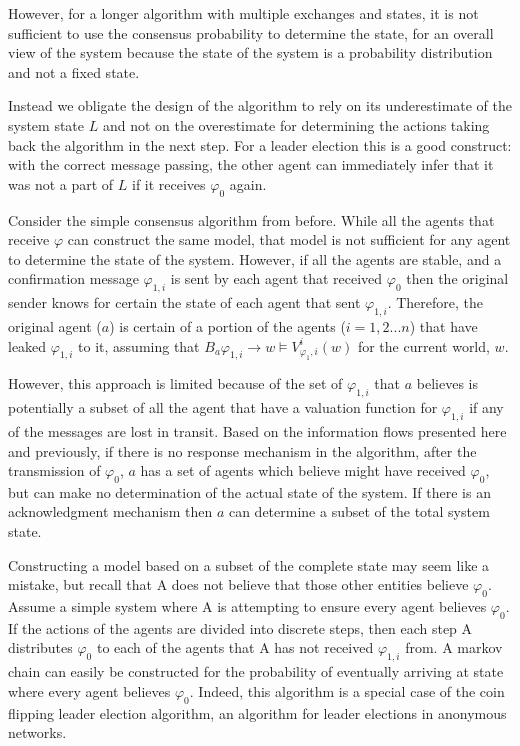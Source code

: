 However, for a longer algorithm with multiple exchanges and states, it is not sufficient to use the consensus probability to determine the state, for an overall view of the system because the state of the system is a probability distribution and not a fixed state.

Instead we obligate the design of the algorithm to rely on its underestimate of the system state $L$ and not on the overestimate for determining the actions taking back the algorithm in the next step. For a leader election this is a good construct: with the correct message passing, the other agent can immediately infer that it was not a part of $L$ if it receives $\varphi_0$ again. 

Consider the simple consensus algorithm from before. While all the agents that receive $\varphi$ can construct the same model, that model is not sufficient for any agent to determine the state of the system. However, if all the agents are stable, and a confirmation message $\varphi_{1,i}$ is sent by each agent that received $\varphi_0$ then the original sender knows for certain the state of each agent that sent $\varphi_{1,i}$. Therefore, the original agent ($a$) is certain of a portion of the agents ($i=1,2...n$) that have leaked $\varphi_{1,i}$ to it, assuming that $B_a \varphi_{1,i} \rightarrow w \vDash V_{\varphi_1,i}^i(w)$ for the current world, $w$.

However, this approach is limited because of the set of $\varphi_{1,i}$ that $a$ believes is potentially a subset of all the agent that have a valuation function for $\varphi_{1,i}$ if any of the messages are lost in transit. Based on the information flows presented here and previously, if there is no response mechanism in the algorithm, after the transmission of $\varphi_0$, $a$ has a set of agents which believe might have received $\varphi_0$, but can make no determination of the actual state of the system. If there is an acknowledgment mechanism then $a$ can determine a subset of the total system state. 

Constructing a model based on a subset of the complete state may seem like a mistake, but recall that A does not believe that those other entities believe $\varphi_0$. Assume a simple system where A is attempting to ensure every agent believes $\varphi_0$. If the actions of the agents are divided into discrete steps, then each step A distributes $\varphi_0$ to each of the agents that A has not received $\varphi_{1,i}$ from. A markov chain can easily be constructed for the probability of eventually arriving at state where every agent believes $\varphi_0$. Indeed, this algorithm is a special case of the coin flipping leader election algorithm, an algorithm for leader elections in anonymous networks.

